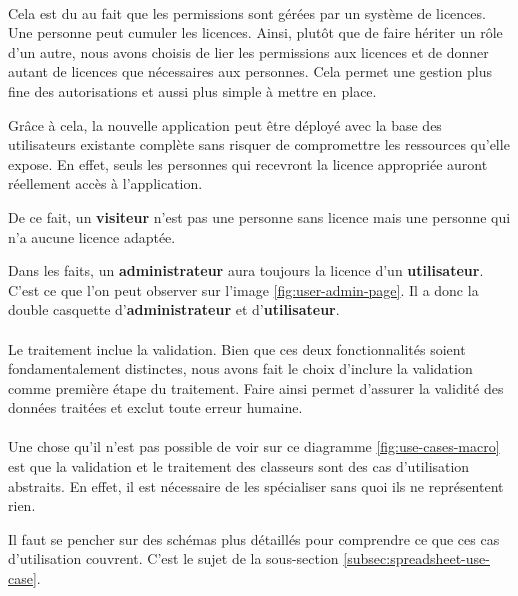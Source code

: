 \paragraph{}
Cela est du au fait que les permissions sont gérées par un système de licences. Une personne peut cumuler les licences. Ainsi, plutôt que de faire hériter un rôle d'un autre, nous avons choisis de lier les permissions aux licences et de donner autant de licences que nécessaires aux personnes. Cela permet une gestion plus fine des autorisations et aussi plus simple à mettre en place.

Grâce à cela, la nouvelle application peut être déployé avec la base des utilisateurs existante complète sans risquer de compromettre les ressources qu'elle expose. En effet, seuls les personnes qui recevront la licence appropriée auront réellement accès à l'application.

De ce fait, un \textbf{visiteur} n'est pas une personne sans licence mais une personne qui n'a aucune licence adaptée.

Dans les faits, un \textbf{administrateur} aura toujours la licence d'un \textbf{utilisateur}. C'est ce que l'on peut observer sur l'image \ref{fig:user-admin-page}. Il a donc la double casquette d'\textbf{administrateur} et d'\textbf{utilisateur}.

\paragraph{}
Le traitement inclue la validation. Bien que ces deux fonctionnalités soient fondamentalement distinctes, nous avons fait le choix d'inclure la validation comme première étape du traitement. Faire ainsi permet d'assurer la validité des données traitées et exclut toute erreur humaine.

\paragraph{}
Une chose qu'il n'est pas possible de voir sur ce diagramme \ref{fig:use-cases-macro} est que la validation et le traitement des classeurs sont des cas d'utilisation abstraits. En effet, il est nécessaire de les spécialiser sans quoi ils ne représentent rien.

Il faut se pencher sur des schémas plus détaillés pour comprendre ce que ces cas d'utilisation couvrent. C'est le sujet de la sous-section \ref{subsec:spreadsheet-use-case}.

